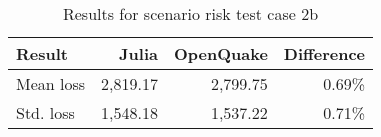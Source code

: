 \begin{table}[h]

\centering
\begin{tabular}{ l r r r }

\hline
\rowcolor{anti-flashwhite}
\bf{Result} & \bf{Julia} & \bf{OpenQuake} & \bf{Difference}\\
\hline
Mean loss & 2,819.17 & 2,799.75 & 0.69\% \\
Std. loss & 1,548.18 & 1,537.22 & 0.71\% \\
\hline
\end{tabular}

\caption{Results for scenario risk test case 2b}
\label{tab:result-sr-2b}
\end{table}
